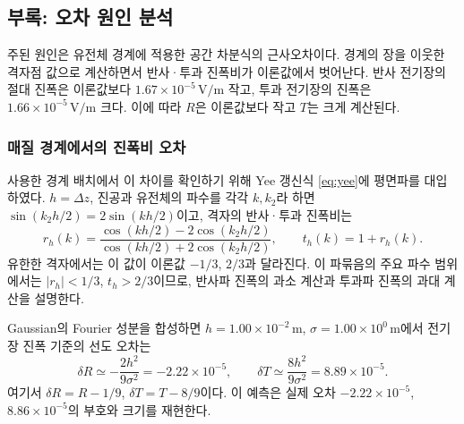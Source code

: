 \documentclass[11pt,a4paper]{article}
\newcommand{\unit}[1]{\,\mathrm{#1}}
\newcommand{\sci}[2]{\mathord{#1\times10^{#2}}}
\begin{document}
\endgroup
\newpage\subsection{부록: 오차 원인 분석}
주된 원인은 유전체 경계에 적용한 공간 차분식의 근사오차이다.
경계의 장을 이웃한 격자점 값으로 계산하면서 반사·투과 진폭비가 이론값에서 벗어난다.
반사 전기장의 절대 진폭은 이론값보다 $\sci{1.67}{-5}\unit{V/m}$ 작고,
투과 전기장의 진폭은 $\sci{1.66}{-5}\unit{V/m}$ 크다.
이에 따라 $R$은 이론값보다 작고 $T$는 크게 계산된다.

\subsubsection{매질 경계에서의 진폭비 오차}
사용한 경계 배치에서 이 차이를 확인하기 위해 Yee 갱신식 \eqref{eq:yee}에
평면파를 대입하였다. $h=\Delta z$, 진공과 유전체의 파수를 각각 $k,k_2$라 하면
$\sin(k_2h/2)=2\sin(kh/2)$이고, 격자의 반사·투과 진폭비는
\begin{equation}
 r_h(k)=\frac{\cos(kh/2)-2\cos(k_2h/2)}
                   {\cos(kh/2)+2\cos(k_2h/2)},\qquad t_h(k)=1+r_h(k).
 \label{eq:lattice-fresnel}
\end{equation}
유한한 격자에서는 이 값이 이론값 $-1/3$, $2/3$과 달라진다.
이 파묶음의 주요 파수 범위에서는 $|r_h|<1/3$, $t_h>2/3$이므로,
반사파 진폭의 과소 계산과 투과파 진폭의 과대 계산을 설명한다.

Gaussian의 Fourier 성분을 합성하면 $h=\sci{1.00}{-2}\unit m$,
$\sigma=\sci{1.00}{0}\unit m$에서 전기장 진폭 기준의 선도 오차는
\begin{equation}
 \delta R\simeq-\frac{2h^2}{9\sigma^2}=\sci{-2.22}{-5},\qquad
 \delta T\simeq\frac{8h^2}{9\sigma^2}=\sci{8.89}{-5}.
\end{equation}
여기서 $\delta R=R-1/9$, $\delta T=T-8/9$이다.
이 예측은 실제 오차 $\sci{-2.22}{-5}$, $\sci{8.86}{-5}$의 부호와 크기를 재현한다.
\end{document}
